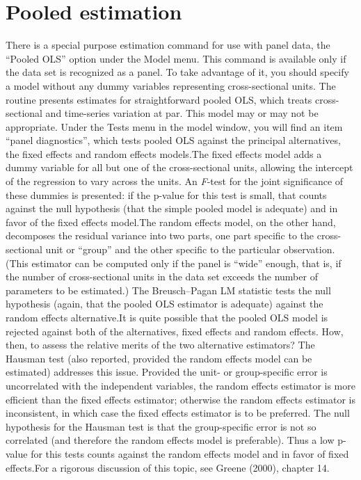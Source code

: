 \section{Pooled estimation}
\label{pooled-est}

There is a special purpose estimation command for use with panel data,
the ``Pooled OLS'' option under the \textsf{Model} menu. This command
is available only if the data set is recognized as a panel.  To take
advantage of it, you should specify a model without any dummy
variables representing cross-sectional units.  The routine presents
estimates for straightforward pooled OLS, which treats cross-sectional
and time-series variation at par.  This model may or may not be
appropriate.  Under the \textsf{Tests} menu in the model window, you
will find an item ``panel diagnostics'', which tests pooled OLS
against the principal alternatives, the fixed effects and random
effects models.The fixed effects model adds a dummy variable for all
but one of the cross-sectional units, allowing the intercept of the
regression to vary across the units.  An \emph{F}-test for the joint
significance of these dummies is presented: if the p-value for this
test is small, that counts against the null hypothesis (that the
simple pooled model is adequate) and in favor of the fixed effects
model.The random effects model, on the other hand, decomposes the
residual variance into two parts, one part specific to the
cross-sectional unit or ``group'' and the other specific to the
particular observation.  (This estimator can be computed only if the
panel is ``wide'' enough, that is, if the number of cross-sectional
units in the data set exceeds the number of parameters to be
estimated.)  The Breusch--Pagan LM statistic tests the null hypothesis
(again, that the pooled OLS estimator is adequate) against the random
effects alternative.It is quite possible that the pooled OLS model is
rejected against both of the alternatives, fixed effects and random
effects. How, then, to assess the relative merits of the two
alternative estimators?  The Hausman test (also reported, provided the
random effects model can be estimated) addresses this issue.  Provided
the unit- or group-specific error is uncorrelated with the independent
variables, the random effects estimator is more efficient than the
fixed effects estimator; otherwise the random effects estimator is
inconsistent, in which case the fixed effects estimator is to be
preferred.  The null hypothesis for the Hausman test is that the
group-specific error is not so correlated (and therefore the random
effects model is preferable).  Thus a low p-value for this tests
counts against the random effects model and in favor of fixed
effects.For a rigorous discussion of this topic, see Greene (2000),
chapter 14.

